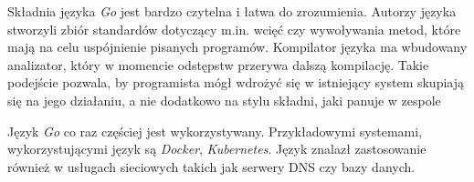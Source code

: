 Składnia języka \textsl{Go} jest bardzo czytelna i łatwa do zrozumienia. Autorzy języka stworzyli zbiór standardów dotyczący m.in. wcięć czy wywoływania metod, które mają na celu uspójnienie pisanych programów. Kompilator języka ma wbudowany analizator, który w momencie odstępstw przerywa dalszą kompilację. Takie podejście pozwala, by programista mógł wdrożyć się w istniejący system skupiają się na jego działaniu, a nie dodatkowo na stylu składni, jaki panuje w zespole

Język \textsl{Go} co raz częściej jest wykorzystywany. Przykładowymi systemami, wykorzystującymi język są \textsl{Docker}, \textsl{Kubernetes}. Język znalazł zastosowanie również w usługach sieciowych takich jak serwery DNS czy bazy danych.